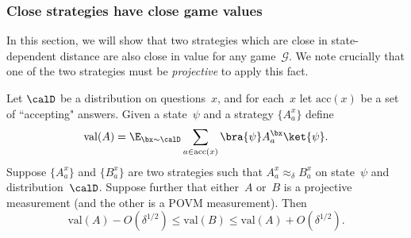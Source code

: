 \documentclass[11pt]{article}
\newcommand{\game}{\mathscr{G}}
\begin{document}
\subsubsection{Close strategies have close game values}

In this section, we will show that two strategies which are close in state-dependent distance are also close in value for any game~$\game$.
We note crucially that one of the two strategies must be \emph{projective} to apply this fact.

\begin{fact}\label{fact:approx-delta-generalized-game-value}
Let $\calD$ be a distribution on questions~$x$, and for each~$x$ let $\mathrm{acc}(x)$ be a set of ``accepting" answers.
Given a state~$\psi$ and a strategy $\{A^x_a\}$ define
\begin{equation*}
\mathrm{val}(A) = \E_{\bx \sim \calD} \sum_{a \in \mathrm{acc}(x)} \bra{\psi} A^{\bx}_a \ket{\psi}.
\end{equation*}
Suppose $\{A^x_a\}$ and $\{B^x_a\}$ are two strategies such that $A^x_a \approx_\delta B^x_a$ on state~$\psi$ and distribution~$\calD$.
Suppose further that either~$A$ or~$B$ is a projective measurement (and the other is a POVM measurement).
Then
\begin{equation*}
\mathrm{val}(A) - O(\delta^{1/2}) \leq \mathrm{val}(B) \leq \mathrm{val}(A) + O(\delta^{1/2}).
\end{equation*}
\end{fact}
\end{document}
